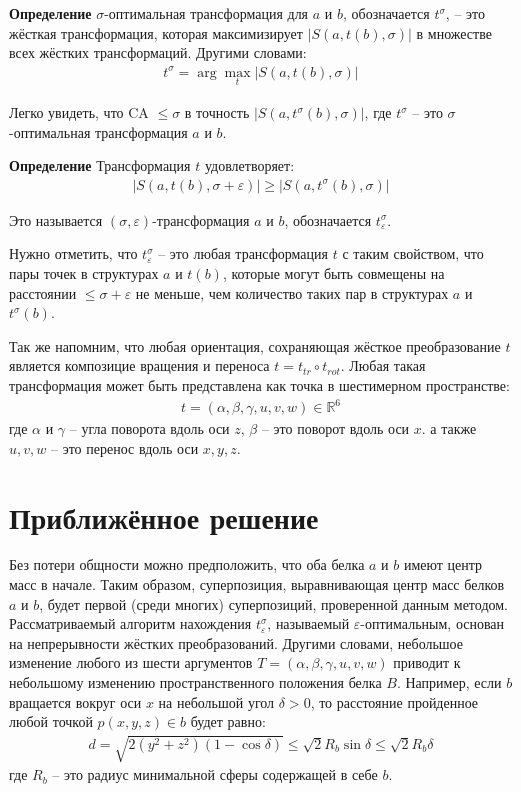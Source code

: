 \documentclass[a4paper]{extreport}
\newcommand{\bb}{\textbf}
\newcommand{\eps}{\varepsilon}
\begin{document}
\bb{Определение} $\sigma$-оптимальная трансформация для $a$ и $b$, обозначается $t^\sigma$, -- это жёсткая трансформация, которая максимизирует $|S(a, t(b), \sigma)|$ в множестве всех жёстких трансформаций. Другими словами:
\begin{gather*}
t^\sigma = \arg \max_t |S(a, t(b), \sigma)|
\end{gather*}

Легко увидеть, что CA $\leq \sigma$ в точность $|S(a, t^\sigma (b), \sigma)|$, где $t^\sigma$ -- это $\sigma$-оптимальная трансформация $a$ и $b$.

\bb{Определение} Трансформация $t$ удовлетворяет:
\begin{gather*}
|S(a, t(b), \sigma + \eps)| \geq |S(a, t^\sigma (b), \sigma)|
\end{gather*}

Это называется $(\sigma, \eps)$-трансформация $a$ и $b$, обозначается $t_\eps^\sigma$.

Нужно отметить, что $t_\eps^\sigma$ -- это любая трансформация $t$ с таким свойством, что пары точек в структурах $a$ и $t(b)$, которые могут быть совмещены на расстоянии $\leq \sigma + \eps$ не меньше, чем количество таких пар в структурах $a$ и $t^\sigma(b)$.

Так же напомним, что любая ориентация, сохраняющая жёсткое преобразование $t$ является композицие вращения и переноса $t = t_{tr} \circ t_{rot}$. Любая такая трансформация может быть представлена как точка в шестимерном пространстве:
\begin{gather*}
t = (\alpha, \beta, \gamma, u, v, w) \in \mathbb{R}^6
\end{gather*}
где $\alpha$ и $\gamma$ -- угла поворота вдоль оси $z$, $\beta$ -- это поворот вдоль оси $x$. а также $u, v, w$  -- это перенос вдоль оси $x, y, z$.

\section{ Приближённое решение }
Без потери общности можно предположить, что оба белка $a$ и $b$ имеют центр масс в начале. Таким образом, суперпозиция, выравнивающая центр масс белков $a$ и $b$, будет первой (среди многих) суперпозиций, проверенной данным методом. Рассматриваемый алгоритм нахождения $t_\eps^\sigma$, называемый $\eps$-оптимальным, основан на непрерывности жёстких преобразований. Другими словами, небольшое изменение любого из шести аргументов $T=(\alpha, \beta, \gamma, u, v, w)$ приводит к небольшому изменению пространственного положения белка $B$. Например, если $b$ вращается вокруг оси $x$ на небольшой угол $\delta > 0$, то расстояние пройденное любой точкой $p(x, y, z) \in b$ будет равно:
\begin{gather*}
d = \sqrt{2(y^2 + z^2)(1 - \cos \delta)} \leq \sqrt{2}R_b\sin\delta \leq \sqrt{2} R_b\delta
\end{gather*}  
где $R_b$ -- это радиус минимальной сферы содержащей в себе $b$.
\end{document}
